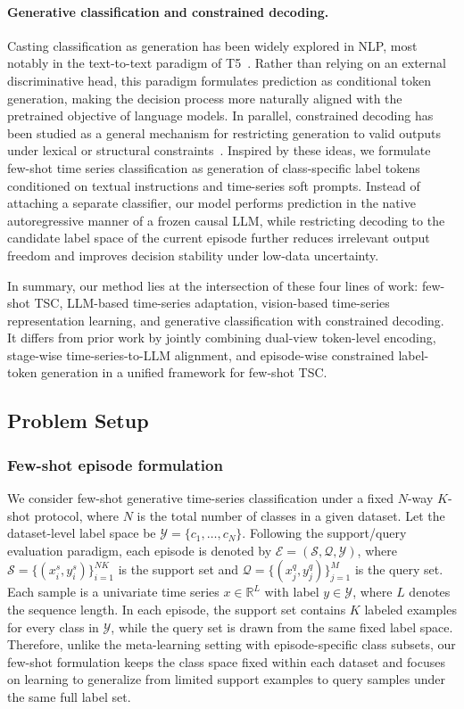 \documentclass[lettersize,journal]{IEEEtran}
\begin{document}
\paragraph{Generative classification and constrained decoding.}
Casting classification as generation has been widely explored in NLP, most notably in the text-to-text paradigm of T5~\cite{raffel2020exploring}. Rather than relying on an external discriminative head, this paradigm formulates prediction as conditional token generation, making the decision process more naturally aligned with the pretrained objective of language models. In parallel, constrained decoding has been studied as a general mechanism for restricting generation to valid outputs under lexical or structural constraints~\cite{hokamp2017lexically,koo2024automata}. Inspired by these ideas, we formulate few-shot time series classification as generation of class-specific label tokens conditioned on textual instructions and time-series soft prompts. Instead of attaching a separate classifier, our model performs prediction in the native autoregressive manner of a frozen causal LLM, while restricting decoding to the candidate label space of the current episode further reduces irrelevant output freedom and improves decision stability under low-data uncertainty.

In summary, our method lies at the intersection of these four lines of work: few-shot TSC, LLM-based time-series adaptation, vision-based time-series representation learning, and generative classification with constrained decoding. It differs from prior work by jointly combining dual-view token-level encoding, stage-wise time-series-to-LLM alignment, and episode-wise constrained label-token generation in a unified framework for few-shot TSC.


\subsection{Problem Setup}
\subsubsection{Few-shot episode formulation}
We consider few-shot generative time-series classification under a fixed $N$-way $K$-shot protocol, where $N$ is the total number of classes in a given dataset. 
Let the dataset-level label space be
$\mathcal{Y}=\{c_1,\ldots,c_N\}$. 
Following the support/query evaluation paradigm, each episode is denoted by $\mathcal{E}=(\mathcal{S},\mathcal{Q},\mathcal{Y})$, where
$\mathcal{S}=\{(x_i^{s},y_i^{s})\}_{i=1}^{NK}$ is the support set and
$\mathcal{Q}=\{(x_j^{q},y_j^{q})\}_{j=1}^{M}$ is the query set. 
Each sample is a univariate time series $x\in\mathbb{R}^{L}$ with label $y\in\mathcal{Y}$, where $L$ denotes the sequence length. 
In each episode, the support set contains $K$ labeled examples for every class in $\mathcal{Y}$, while the query set is drawn from the same fixed label space. 
Therefore, unlike the meta-learning setting with episode-specific class subsets, our few-shot formulation keeps the class space fixed within each dataset and focuses on learning to generalize from limited support examples to query samples under the same full label set.
\end{document}
